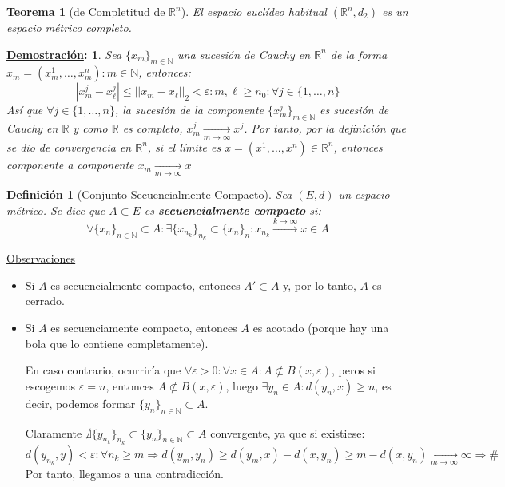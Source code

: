 \documentclass[10pt,a4paper,openright]{book}
\theoremstyle{break}
\newtheorem*{defi}{Definición}
\newtheorem*{theo}{Teorema}
\newtheorem*{demo}{\underline{Demostración}:}
\begin{document}
\begin{theo}[de Completitud de $\mathbb{R}^n$]
El espacio euclídeo habitual $(\mathbb{R}^n, d_2)$ es un espacio métrico completo.
\end{theo}

\begin{demo}
Sea $\{x_m\}_{m\in \mathbb{N}}$ una sucesión de Cauchy en $\mathbb{R}^n$ de la forma $x_m = (x_m^1, \ldots , x_m^n) : m \in \mathbb{N}$, entonces:
$$|x_m^j - x_\ell^j| \leq ||x_m - x_\ell ||_2 < \varepsilon : m,\ell \geq n_0 : \forall j \in \{ 1, \ldots,n\}$$
Así que $\forall j \in \{ 1, \ldots,n\}$, la sucesión de la componente $\{x_m^j\}_{m \in \mathbb{N}}$ es sucesión de Cauchy en $\mathbb{R}$ y como $\mathbb{R}$ es completo, $x_m^j \xrightarrow[m\rightarrow\infty]{} x^j$. Por tanto, por la definición que se dio de convergencia en $\mathbb{R}^{n}$, si el límite es $x=(x^1, \ldots, x^n) \in \mathbb{R}^n$, entonces componente a componente $x_m \xrightarrow[m\rightarrow\infty]{} x$
\end{demo}

\begin{defi}[Conjunto Secuencialmente Compacto]
Sea $(E,d)$ un espacio métrico. Se dice que $A \subset E$ es \textbf{secuencialmente compacto} si:
$$\forall \{x_n\}_{n \in \mathbb{N}} \subset A : \exists \{ x_{n_k}\}_{n_k} \subset \{ x_n\}_n : x_{n_{k}}\xrightarrow{k\rightarrow\infty} x \in A$$
\end{defi}

\underline{Observaciones}

\begin{itemize}
\item Si $A$ es secuencialmente compacto, entonces $A' \subset A$ y, por lo tanto,  $A$ es cerrado.

\item Si $A$ es secuenciamente compacto, entonces $A$ es acotado (porque hay una bola que lo contiene completamente). 

En caso contrario, ocurriría que $\forall \varepsilon > 0 : \forall x \in A: A \not\subset B(x,\varepsilon)$, peros si escogemos $\varepsilon = n$, entonces $A\not\subset B(x,\varepsilon)$, luego $\exists y_n \in A : d(y_n,x) \geq n$, es decir, podemos formar $\{y_n\}_{n\in \mathbb{N}}\subset A$.

Claramente $\nexists \{ y_{n_k}\}_{n_k} \subset \{ y_n\}_{n \in \mathbb{N}}\subset A$ convergente, ya que si existiese:
$$d(y_{n_k}, y) < \varepsilon : \forall n_k \geq m \Rightarrow d(y_m, y_n) \geq d(y_m,x) - d(x, y_n) \geq m - d(x, y_n) \xrightarrow[m\rightarrow\infty]{} \infty \Rightarrow \#$$
Por tanto, llegamos a una contradicción.
\end{itemize}
\end{document}
